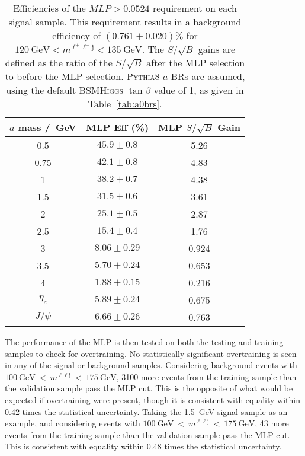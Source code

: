 \documentclass[NOTE, atlasdraft=true, texlive=2017, UKenglish]{\ATLASLATEXPATH atlasdoc}
\begin{document}
\begin{table}[!htbp]{\footnotesize\renewcommand{\arraystretch}{1.2}
  \begin{center}
    \footnotesize
    \begin{tabular}{|c|cc|}
      \hline
      $a$ mass /~GeV & MLP Eff (\%) & MLP $S/\sqrt{B}$ Gain \\
      \hline
      0.5 & $45.9 \pm 0.8$ & 5.26 \\
      0.75 & $42.1 \pm 0.8$ & 4.83 \\
      1 & $38.2 \pm 0.7$ & 4.38 \\
      1.5 & $31.5 \pm 0.6$ & 3.61 \\
      2 & $25.1 \pm 0.5$ & 2.87 \\
      2.5 & $15.4 \pm 0.4$ & 1.76 \\
      3 & $8.06 \pm 0.29$ & 0.924 \\
      3.5 & $5.70 \pm 0.24$ & 0.653 \\
      4 & $1.88 \pm 0.15$ & 0.216 \\
      \hline
      $\eta_c$ & $5.89 \pm 0.24$ & 0.675 \\
      $J/\psi$ & $6.66 \pm 0.26$ & 0.763 \\
      \hline
    \end{tabular}
    \caption{Efficiencies of the $MLP>0.0524$ requirement on each signal sample. This requirement results in a background efficiency of $(0.761\pm 0.020)\%$ for $120\ \text{GeV}<m^{\ell^+\ell^-\text{j}}<135\ \text{GeV}$. The $S/\sqrt{B}$ gains are defined as the ratio of the $S/\sqrt{B}$ after the MLP selection to before the MLP selection. \textsc{Pythia}8 $a$ BRs are assumed, using the default \textsc{BSMHiggs} $\tan\beta$ value of 1, as given in Table~\ref{tab:a0brs}.}
    \label{tab:mlpwps}
  \end{center}}
\end{table}


The performance of the MLP is then tested on both the testing and training samples to check for overtraining. No statistically significant overtraining is seen in any of the signal or background samples. Considering background events with $100\ \text{GeV}\ <\ m^{\ell\ell\text{j}}\ <\ 175\ \text{GeV}$, 3100 more events from the training sample than the validation sample pass the MLP cut. This is the opposite of what would be expected if overtraining were present, though it is consistent with equality within 0.42 times the statistical uncertainty. Taking the 1.5~GeV signal sample as an example, and considering events with $100\ \text{GeV}\ <\ m^{\ell\ell\text{j}}\ <\ 175\ \text{GeV}$, 43 more events from the training sample than the validation sample pass the MLP cut. This is consistent with equality within 0.48 times the statistical uncertainty.
\end{document}
